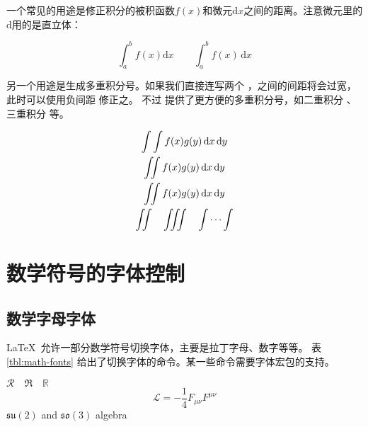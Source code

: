 一个常见的用途是修正积分的被积函数$f(x)$和微元$\mathrm{d}x$之间的距离。注意微元里的$\mathrm{d}$用的是直立体：
\begin{example}
\[
\int_a^b f(x)\mathrm{d}x
\qquad
\int_a^b f(x)\,\mathrm{d}x
\]
\end{example}

另一个用途是生成多重积分号。如果我们直接连写两个 ，之间的间距将会过宽，此时可以使用负间距 \cmd{!} 修正之。
不过  提供了更方便的多重积分号，如二重积分 、三重积分  等。
\begin{example}
\newcommand\diff{\,\mathrm{d}}
\begin{gather*}
\int\int f(x)g(y)
\diff x \diff y \\
\int\!\!\!\int
f(x)g(y) \diff x \diff y \\
\iint f(x)g(y) \diff x \diff y \\
\iint\quad \iiint\quad \idotsint
\end{gather*}
\end{example}

\section{数学符号的字体控制}

\subsection{数学字母字体}\label{subsec:math-alpha}

\LaTeX\ 允许一部分数学符号切换字体，主要是拉丁字母、数字等等。
表 \ref{tbl:math-fonts} 给出了切换字体的命令。某一些命令需要字体宏包的支持。
\begin{example}
$\mathcal{R} \quad \mathfrak{R} 
\quad \mathbb{R}$ 
\[\mathcal{L}
= -\frac{1}{4}F_{\mu\nu}F^{\mu\nu}\]
$\mathfrak{su}(2)$ and
$\mathfrak{so}(3)$ algebra
\end{example}

